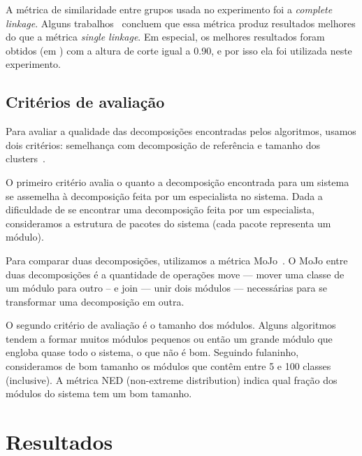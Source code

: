 A métrica de similaridade entre grupos usada no experimento foi a
\emph{complete linkage}. Alguns trabalhos~\cite{Wu2005,Anquetil1999}
concluem que essa métrica produz resultados melhores do que a métrica 
\emph{single linkage}. Em especial, os melhores resultados foram obtidos
(em \cite{Wu2005}) com a altura de corte igual a 0.90, e por isso ela
foi utilizada neste experimento.

%
%
%

\subsection{Critérios de avaliação}
Para avaliar a qualidade das decomposições encontradas pelos algoritmos,
usamos dois critérios: semelhança com decomposição de referência e
tamanho dos clusters~\cite{Anquetil1999}.

O primeiro critério avalia o quanto a decomposição encontrada para um
sistema se assemelha à decomposição feita por um especialista no sistema.
Dada a dificuldade de se encontrar uma decomposição feita por um especialista,
consideramos a estrutura de pacotes do sistema (cada pacote representa um 
módulo).

Para comparar duas decomposições, utilizamos a métrica MoJo~\cite{Tzerpos1999}.
O MoJo entre 
duas decomposições é a quantidade de operações move --- mover uma classe
de um módulo para outro -- e join --- unir dois módulos --- necessárias
para se transformar uma decomposição em outra.

O segundo critério de avaliação é o tamanho dos módulos. Alguns algoritmos
tendem a formar muitos módulos pequenos ou então um grande módulo que engloba
quase todo o sistema, o que não é bom. 
Seguindo fulaninho, consideramos de bom tamanho os módulos que contêm
entre 5 e 100 classes (inclusive). A métrica NED (non-extreme distribution)
indica qual fração dos módulos do sistema tem um bom tamanho.


\section{Resultados} \label{sec:resultados}

